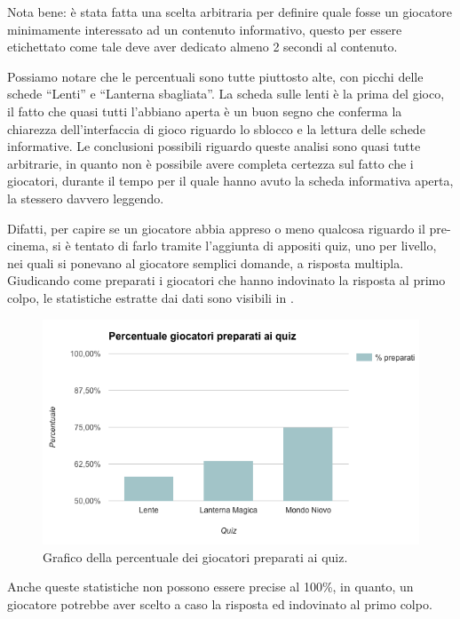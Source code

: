 Nota bene: è stata fatta una scelta arbitraria per definire quale fosse un giocatore minimamente interessato ad un contenuto informativo, questo per essere etichettato come tale deve aver dedicato almeno 2 secondi al contenuto.

Possiamo notare che le percentuali sono tutte piuttosto alte, con picchi delle schede ``Lenti'' e ``Lanterna sbagliata''. La scheda sulle lenti è la prima del gioco, il fatto che quasi tutti l'abbiano aperta è un buon segno che conferma la chiarezza dell'interfaccia di gioco riguardo lo sblocco e la lettura delle schede informative. Le conclusioni possibili riguardo queste analisi sono quasi tutte arbitrarie, in quanto non è possibile avere completa certezza sul fatto che i giocatori, durante il tempo per il quale hanno avuto la scheda informativa aperta, la stessero davvero leggendo.

Difatti, per capire se un giocatore abbia appreso o meno qualcosa riguardo il pre-cinema, si è tentato di farlo tramite l'aggiunta di appositi quiz, uno per livello, nei quali si ponevano al giocatore semplici domande, a risposta multipla. Giudicando come preparati i giocatori che hanno indovinato la risposta al primo colpo, le statistiche estratte dai dati sono visibili in \myfig{\ref{fig:test-quiz}}.

\begin{figure}[h]
\centerline{\includegraphics[scale=0.65]{images/risultati/test-quiz.png}}
\caption{Grafico della percentuale dei giocatori preparati ai quiz.}
\label{fig:test-quiz}
\end{figure}

Anche queste statistiche non possono essere precise al 100\%, in quanto, un giocatore potrebbe aver scelto a caso la risposta ed indovinato al primo colpo.

